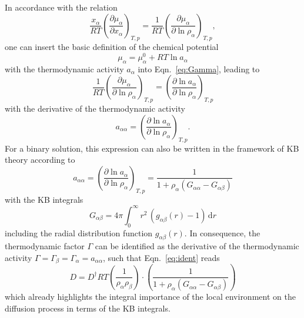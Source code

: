 \documentclass[aip,jcp,reprint]{revtex4-1}
\begin{document}
In accordance with the relation
\begin{equation}
 \label{eq:Gamma}
    \frac{x_{\alpha}}{RT}\left(\frac{\partial \mu_{\alpha}}{\partial x_{\alpha}}\right)_{T,p} = \frac{1}{RT}\left(\frac{\partial \mu_{\alpha}}{\partial \ln \rho_{\alpha}}\right)_{T,p},
\end{equation}
one can insert the basic definition of the chemical potential
\begin{equation}
    \mu_{\alpha} = \mu_{\alpha}^0 + RT\ln a_{\alpha}
\end{equation}
with the thermodynamic activity $a_{\alpha}$ into Eqn.~\eqref{eq:Gamma}, leading to
\begin{equation}
 \label{eq:KBGamma}
    \frac{1}{RT}\left(\frac{\partial \mu_{\alpha}}{\partial \ln \rho_{\alpha}}\right)_{T,p}=\left(\frac{\partial \ln a_{\alpha}}{\partial \ln \rho_{\alpha}}\right)_{T,p}
\end{equation}
with the derivative of the  thermodynamic activity  
\begin{equation}
a_{\alpha\alpha} = \left(\frac{\partial \ln a_{\alpha}}{\partial \ln \rho_{\alpha}}\right)_{T,p}.
\end{equation}
For a binary solution, this expression can also be written in the framework of KB theory \cite{ben13a,smiatek18a,pierce08a,smith06}
according to
\begin{equation}
 \label{eq:act}
 a_{\alpha\alpha} = \left(\frac{\partial \ln a_{\alpha}}{\partial \ln \rho_{\alpha}}\right)_{T,p} = \frac{1}{1+\rho_{\alpha}(G_{\alpha\alpha}-G_{\alpha\beta})}
\end{equation}
with the KB integrals
\begin{equation}
 \label{eq:KBI}
 G_{\alpha\beta} = 4\pi \int_0^{\infty}r^2\, (g_{\alpha\beta}(r) - 1)\,\textrm{d}r
\end{equation}
including the radial distribution function $g_{\alpha\beta}(r)$. In consequence, the thermodynamic factor $\Gamma$ can be identified as the derivative of the thermodynamic activity $\Gamma = \Gamma_{\beta} = \Gamma_{\alpha} = a_{\alpha\alpha}$, such that Eqn.~\eqref{eq:ident} reads
\begin{equation}
 \label{eq:DMS}
D = D^{\dag}RT\left(\frac{1}{\rho_{\alpha}\rho_{\beta}}\right)\cdot \left( \frac{1}{1+\rho_{\alpha}(G_{\alpha\alpha}-G_{\alpha\beta})}\right)
\end{equation}
which already highlights the integral importance of the local environment on the diffusion process in terms of the KB integrals. 
\end{document}
